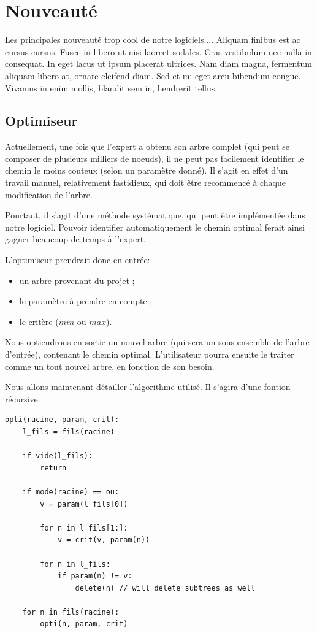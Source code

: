 \section{Nouveauté}
	
	Les principales nouveauté trop cool de notre logiciels....	Aliquam finibus est ac cursus cursus. Fusce in libero ut nisi laoreet sodales. Cras vestibulum nec nulla in consequat. In eget lacus ut ipsum placerat ultrices. Nam diam magna, fermentum aliquam libero at, ornare eleifend diam. Sed et mi eget arcu bibendum congue. Vivamus in enim mollis, blandit sem in, hendrerit tellus.


	\subsection{Optimiseur}
		
		Actuellement, une fois que l'expert a obtenu son arbre complet (qui peut se composer de plusieurs milliers de noeuds), il ne peut pas facilement identifier le chemin le moins couteux (selon un paramètre donné).
		Il s'agit en effet d'un travail manuel, relativement fastidieux, qui doit être recommencé à chaque modification de l'arbre.
		
		Pourtant, il s'agit d'une méthode systématique, qui peut être implémentée dans notre logiciel.
		Pouvoir identifier automatiquement le chemin optimal ferait ainsi gagner beaucoup de temps à l'expert.
		
		L'optimiseur prendrait donc en entrée:
		\begin{itemize}
			\item un arbre provenant du projet ;
			\item le paramètre à prendre en compte ;
			\item le critère ($min$ ou $max$).
		\end{itemize}
		
		Nous optiendrons en sortie un nouvel arbre (qui sera un sous ensemble de l'arbre d'entrée), contenant le chemin optimal. 
		L'utilisateur pourra ensuite le traiter comme un tout nouvel arbre, en fonction de son besoin.
		
		Nous allons maintenant détailler l'algorithme utilisé. Il s'agira d'une fontion récursive.

		\begin{lstlisting}
opti(racine, param, crit):
	l_fils = fils(racine)

	if vide(l_fils):
		return

	if mode(racine) == ou:
		v = param(l_fils[0])

		for n in l_fils[1:]:
			v = crit(v, param(n))

		for n in l_fils:
			if param(n) != v:
				delete(n) // will delete subtrees as well
	
	for n in fils(racine):
		opti(n, param, crit)
		\end{lstlisting}


